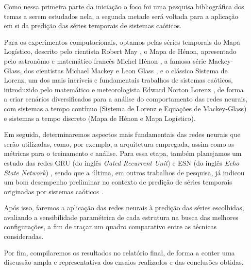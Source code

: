 \documentclass[a4paper, 12pt]{article}
\begin{document}
Como nessa primeira parte da iniciação o foco foi uma pesquisa bibliográfica dos temas a serem estudados nela, a segunda metade será voltada para a aplicação em si da predição das séries temporais de sistemas caóticos.

Para os experimentos computacionais, optamos pelas séries temporais do Mapa Logístico, descrito pelo cientista Robert May \cite{may1976simple}, o Mapa de Hénon, apresentado pelo astronômo e matemático francês Michel Hénon \cite{henon1976two}, a famosa série Mackey-Glass, dos cientistas Michael Mackey e Leon Glass \cite{mackey1977oscillation}, e o clássico Sistema de Lorenz, um dos  mais incríveis e fundamentais trabalhos de sistemas caóticos, introduzido pelo matemático e meteorologista Edward Norton Lorenz \cite{lorenz1963deterministic}, de forma a criar cenários diversificados para a análise do comportamento das redes neurais, com sistemas a tempo contínuo (Sistema de Lorenz e Equações de Mackey-Glass) e sistemas a tempo discreto (Mapa de Hénon e Mapa Logístico).

Em seguida, determinaremos aspectos mais fundamentais das redes neurais que serão utilizadas, como, por exemplo, a arquitetura empregada, assim como as métricas para o treinamento e análise. Para essa etapa, também planejamos um estudo das redes GRU (do inglês \textit{Gated Recurrent Unit}) \cite{cho2014learning} e ESN (do inglês \textit{Echo State Network}) \cite{jaeger2007echo}, sendo que a última, em outros trabalhos de pesquisa, já indicou um bom desempenho preliminar no contexto de predição de séries temporais originadas por sistemas caóticos \cite{boccato2013novas}.

Após isso, faremos a aplicação das redes neurais à predição das séries escolhidas, avaliando a sensibilidade paramétrica de cada estrutura na busca das melhores configurações, a fim de traçar um quadro comparativo entre as técnicas consideradas. 

Por fim, compilaremos os resultados no relatório final, de forma a conter uma discussão ampla e representativa dos ensaios realizados e das conclusões obtidas. 




\end{document}

